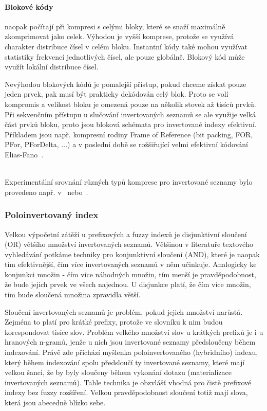 \documentclass[11pt,letterpaper,oneside,openright]{book}
\begin{document}
\paragraph{Blokové kódy} naopak počítají při kompresi s celými bloky, které se
snaží maximálně zkomprimovat jako celek. Výhodou je vyšší komprese, protože se
využívá charakter distribuce čísel v celém bloku. Instantní kódy také mohou
využívat statistiky frekvencí jednotlivých čísel, ale pouze globálně. Blokový
kód může využít lokální distribuce čísel.

Nevýhodou blokových kódů je pomalejší přístup, pokud chceme získat pouze jeden
prvek, pak musí být prakticky dekódován celý blok.  Proto se volí kompromis a
velikost bloku je omezená pouze na několik stovek až tisíců prvků. Při
sekvenčním přístupu u slučování invertovaných seznamů se ale využije velká část
prvků bloku, proto jsou bloková schémata pro invertované indexy efektivní.
Příkladem jsou např.  kompresní rodiny Frame of Reference (bit packing, FOR,
PFor, PForDelta, ...) a v poslední době se rožšiřující velmi efektivní kódování
Elias-Fano~\cite{DBLP:journals/corr/abs-1206-4300,Curtiss:2013:USS:2536222.2536239}.

~\\
Experimentální srovnání různých typů komprese pro invertované seznamy bylo
provedeno např. v~\citep[addenda~6]{buttcher2010information}
nebo~\cite{Zhang:2008:PCI:1367497.1367550}.

\subsubsection{Poloinvertovaný index} \label{sec:half_inverted}
Velkou výpočetní zátěží u prefixových a fuzzy indexů je disjunktivní sloučení
(OR) většího množství invertovaných seznamů.  Většinou v literatuře textového
vyhledávání potkáme techniky pro konjunktivní sloučení (AND), které je naopak
tím efektivnější, čím více invertovaných seznamů v něm učinkuje.  Analogicky ke
konjunkci množin - čím více náhodných množin, tím menší je pravděpodobnost, že
bude jejich prvek ve všech najednou. U disjunkce platí, že čím více množin, tím
bude sloučená množina zpravidla větší.

Sloučení invertovaných seznamů je problém, pokud jejich množství narůstá.
Zejména to platí pro krátké prefixy, protože ve slovníku k nim budou
korespondovat tisíce slov. Problém velkého množství slov u krátkých prefixů je
i u hranových n-gramů, jenže u nich jsou invertované seznamy předsloučeny během
indexování. Právě zde přichází myšlenka poloinvertovaného (hybridního) indexu,
který během indexování spolu předsloučí ty invertované seznamy, které mají
velkou šanci, že by byly sloučeny během vykonání dotazu (materializace
invertovaných seznamů). Tahle technika je obzvlášť vhodná pro čistě prefixové
indexy bez fuzzy rozšíření. Velkou pravděpodobnost sloučení totiž mají slova,
která jsou abecedně blízko sebe.
\end{document}
